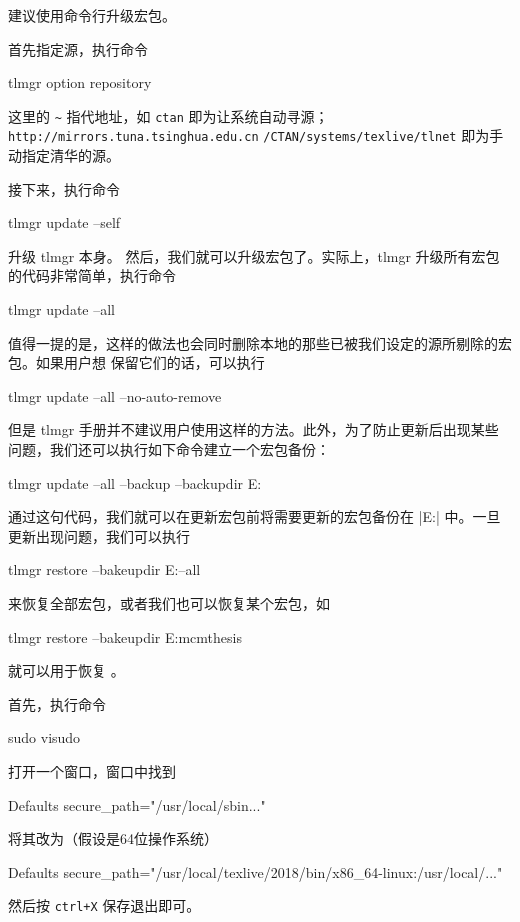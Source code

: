 建议使用命令行升级宏包。

首先指定源，执行命令
\begin{shcode}
tlmgr option repository ~
\end{shcode}
这里的 \verb|~| 指代地址，如 \verb|ctan| 即为让系统自动寻源；
\verb|http://mirrors.tuna.tsinghua.edu.cn| 
\verb|/CTAN/systems/texlive/tlnet| 即为手动指定清华的源。

接下来，执行命令
\begin{shcode}
tlmgr update --self
\end{shcode}
升级 tlmgr 本身。 然后，我们就可以升级宏包了。实际上，tlmgr
升级所有宏包的代码非常简单，执行命令
\begin{shcode}
tlmgr update --all
\end{shcode}

值得一提的是，这样的做法也会同时删除本地的那些已被我们设定的源所剔除的宏包。如果用户想
保留它们的话，可以执行

\begin{shcode}
tlmgr update --all --no-auto-remove
\end{shcode}
但是 tlmgr
手册并不建议用户使用这样的方法。此外，为了防止更新后出现某些问题，我们还可以执行如下命令建立一个宏包备份：

\begin{shcode}
tlmgr update --all --backup --backupdir E:\latexwork\backup
\end{shcode}
通过这句代码，我们就可以在更新宏包前将需要更新的宏包备份在
|E:\latexwork\backup| 中。一旦更新出现问题，我们可以执行

\begin{shcode}
tlmgr restore --bakeupdir E:\latexwork\backup --all
\end{shcode}
来恢复全部宏包，或者我们也可以恢复某个宏包，如

\begin{shcode}
tlmgr restore --bakeupdir E:\latexwork\backup mcmthesis
\end{shcode}
就可以用于恢复 。

首先，执行命令
\begin{shcode}
sudo visudo
\end{shcode}
打开一个窗口，窗口中找到
\begin{shcode}
Defaults secure_path="/usr/local/sbin..."
\end{shcode}
将其改为（假设是64位操作系统）
\begin{shcode}
Defaults secure_path="/usr/local/texlive/2018/bin/x86_64-linux:/usr/local/..."
\end{shcode}
然后按 \verb|ctrl+X| 保存退出即可。

